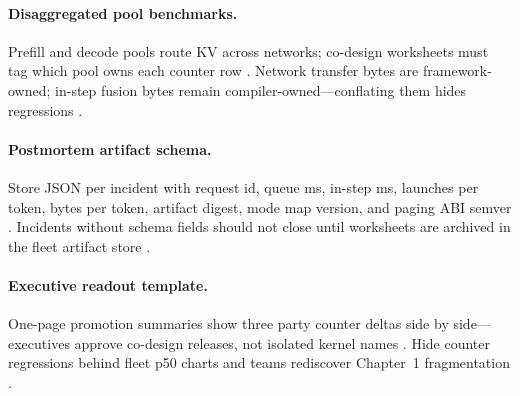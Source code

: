 \paragraph{Disaggregated pool benchmarks.} Prefill and decode pools route KV across networks; co-design worksheets must tag which pool owns each counter row \citep{liu2024deepseekv3,patel2025llminference,kwon2023vllm,yirage2026,chen2020compilerbasedhardw,memoryfloor2026,taxbreak2026,liu2024deepseekv3,nvidia2024cudagraphs,dao2022flashattention,amd2024xdna,amd2024aie,dlbook,dao2023flashdecoding,nvidia2022hopper,semianalysis2024tma}. Network transfer bytes are framework-owned; in-step fusion bytes remain compiler-owned---conflating them hides regressions \citep{liu2024deepseekv3,patel2025llminference,yirage2026,chen2020compilerbasedhardw,kwon2023vllm,memoryfloor2026,taxbreak2026,dlbook}.

\paragraph{Postmortem artifact schema.} Store JSON per incident with request id, queue ms, in-step ms, launches per token, bytes per token, artifact digest, mode map version, and paging ABI semver \citep{yirage2026,chen2020compilerbasedhardw,patel2025llminference,kwon2023vllm,taxbreak2026,memoryfloor2026,liu2024deepseekv3,nvidia2024cudagraphs,dao2022flashattention,amd2024aie,amd2024xdna,dlbook,dao2023flashdecoding,nvidia2022hopper,semianalysis2024tma}. Incidents without schema fields should not close until worksheets are archived in the fleet artifact store \citep{patel2025llminference,yirage2026,chen2020compilerbasedhardw,kwon2023vllm,dlbook}.

\paragraph{Executive readout template.} One-page promotion summaries show three party counter deltas side by side---executives approve co-design releases, not isolated kernel names \citep{patel2025llminference,taxbreak2026,memoryfloor2026,yirage2026,chen2020compilerbasedhardw,kwon2023vllm,liu2024deepseekv3,nvidia2024cudagraphs,dao2022flashattention,amd2024aie,amd2024xdna,dlbook,dao2023flashdecoding,nvidia2022hopper,semianalysis2024tma}. Hide counter regressions behind fleet p50 charts and teams rediscover Chapter~1 fragmentation \citep{patel2025llminference,taxbreak2026,memoryfloor2026,yirage2026,chen2020compilerbasedhardw,dlbook}.

